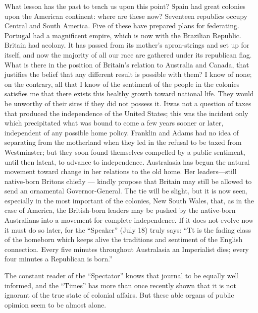 \documentclass[11pt,openany]{book}
\begin{document}
What lesson has the past to teach us upon this point? Spain had great colonies upon the American continent: where are these now? Seventeen republics occupy Central and South America. Five of these have prepared plans for federating. Portugal had a magnificent empire, which is now with the Brazilian Republic. Britain had acolony. It has passed from its mother's apron-strings and set up for itself, and now the majority of all our race are gathered under its republican flag. What is there in the position of Britain's relation to Australia and Canada, that justifies the belief that any different result is possible with them? I know of none; on the contrary, all that I know of the sentiment of the people in the colonies satisfies me that there exists this healthy growth toward national life. They would be unworthy of their sires if they did not possess it. Itwas not a question of taxes that produced the independence of the United States; this was the incident only which precipitated what was bound to come a few years sooner or later, independent of any possible home policy. Franklin and Adams had no idea of separating from the motherland when they led in the refusal to be taxed from Westminster; but they soon found themselves compelled by a public sentiment, until then latent, to advance to independence. Australasia has begun the natural movement toward change in her relations to the old home. Her leaders---still native-born Britons chiefly --- kindly propose that Britain may still be allowed to send an ornamental Governor-General. The tie will be slight, but it is now seen, especially in the most important of the colonies, New South Wales, that, as in the case of America, the British-born leaders may be pushed by the native-born Australians into a movement for complete independence. If it does not evolve now it must do so later, for the ``Speaker'' (July 18) truly says: ``Tt is the fading class of the homeborn which keeps alive the traditions and sentiment of the English connection. Every five minutes throughout Australasia an Imperialist dies; every four minutes a Republican is born.''

The constant reader of the ``Spectator'' knows that journal to be equally well informed, and the ``Times'' has more than once recently shown that it is not ignorant of the true state of colonial affairs. But these able organs of public opimion seem to be almost alone.
\end{document}
